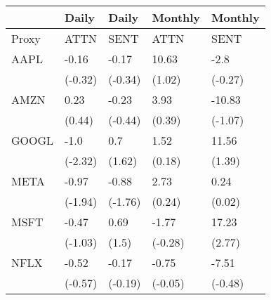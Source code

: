 \begin{tabular}{lllll}
\toprule
{} &    Daily &    Daily &  Monthly &  Monthly \\
\midrule
Proxy &     ATTN &     SENT &     ATTN &     SENT \\
AAPL  &    -0.16 &    -0.17 &    10.63 &     -2.8 \\
      &  (-0.32) &  (-0.34) &   (1.02) &  (-0.27) \\
AMZN  &     0.23 &    -0.23 &     3.93 &   -10.83 \\
      &   (0.44) &  (-0.44) &   (0.39) &  (-1.07) \\
GOOGL &     -1.0 &      0.7 &     1.52 &    11.56 \\
      &  (-2.32) &   (1.62) &   (0.18) &   (1.39) \\
META  &    -0.97 &    -0.88 &     2.73 &     0.24 \\
      &  (-1.94) &  (-1.76) &   (0.24) &   (0.02) \\
MSFT  &    -0.47 &     0.69 &    -1.77 &    17.23 \\
      &  (-1.03) &    (1.5) &  (-0.28) &   (2.77) \\
NFLX  &    -0.52 &    -0.17 &    -0.75 &    -7.51 \\
      &  (-0.57) &  (-0.19) &  (-0.05) &  (-0.48) \\
\bottomrule
\end{tabular}
